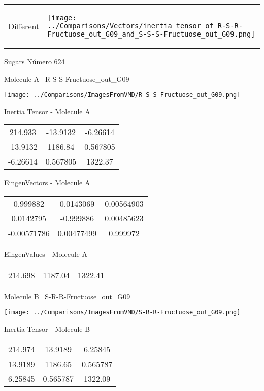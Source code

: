 \vtab[-5mm]
\begin{tabular}{*{2}{m{}}}
\begin{center}
\textcolor{NavyBlue}{\Large Different}
\end{center}
&
\begin{center}
\texttt{[image: ../Comparisons/Vectors/inertia\_tensor\_of\_R-S-R-Fructuose\_out\_G09\_and\_S-S-S-Fructuose\_out\_G09.png]}
\end{center}
\end{tabular}

 \newpage

\vtab[-3cm]
\begin{center}
{\large Sugars \tab Número 624}
\end{center}
\begin{multicols}{2}
\begin{center}

Molecule A \
R-S-S-Fructuose\_out\_G09

\texttt{[image: ../Comparisons/ImagesFromVMD/R-S-S-Fructuose\_out\_G09.png]}

Inertia Tensor - Molecule A \\
\begin{tabular}{|c c c|}
214.933	 & 	-13.9132	 & 	-6.26614	 \\
-13.9132	 & 	1186.84	 & 	0.567805	 \\
-6.26614	 & 	0.567805	 & 	1322.37
\end{tabular}

\vtab
 EingenVectors - Molecule A     \\
\begin{tabular}{|c c c|}
0.999882	 & 	0.0143069	 & 	0.00564903	 \\
0.0142795	 & 	-0.999886	 & 	0.00485623	 \\
-0.00571786	 & 	0.00477499	 & 	0.999972
\end{tabular}

\vtab
 EingenValues - Molecule A     \\
\begin{tabular}{|c c c|}
214.698	 & 	1187.04	 & 	1322.41	 \\
\end{tabular}
\columnbreak

Molecule B \
S-R-R-Fructuose\_out\_G09

\texttt{[image: ../Comparisons/ImagesFromVMD/S-R-R-Fructuose\_out\_G09.png]}

Inertia Tensor - Molecule B \\
\begin{tabular}{|c c c|}
214.974	 & 	13.9189	 & 	6.25845	 \\
13.9189	 & 	1186.65	 & 	0.565787	 \\
6.25845	 & 	0.565787	 & 	1322.09
\end{tabular}


\end{center}
\end{multicols}
